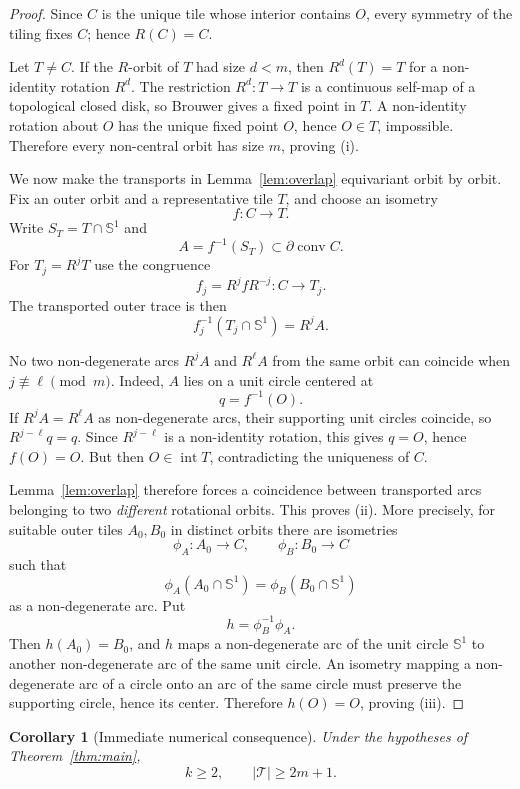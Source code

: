 \documentclass[10.5pt]{article}
\newtheorem{corollary}[theorem]{Corollary}
\theoremstyle{remark}
\newcommand{\Sph}{\mathbb S}
\newcommand{\conv}{\operatorname{conv}}
\newcommand{\interior}{\operatorname{int}}
\begin{document}
\begin{proof}
Since $C$ is the unique tile whose interior contains $O$, every symmetry of the tiling fixes $C$; hence $R(C)=C$.

Let $T\ne C$. If the $R$-orbit of $T$ had size $d<m$, then $R^d(T)=T$ for a non-identity rotation $R^d$. The restriction $R^d:T\to T$ is a continuous self-map of a topological closed disk, so Brouwer gives a fixed point in $T$. A non-identity rotation about $O$ has the unique fixed point $O$, hence $O\in T$, impossible. Therefore every non-central orbit has size $m$, proving (i).

We now make the transports in Lemma~\ref{lem:overlap} equivariant orbit by orbit. Fix an outer orbit and a representative tile $T$, and choose an isometry
\[
 f:C\longrightarrow T.
\]
Write $S_T=T\cap\Sph^1$ and
\[
 A=f^{-1}(S_T)\subset\partial\conv C.
\]
For $T_j=R^jT$ use the congruence
\[
 f_j=R^j f R^{-j}:C\longrightarrow T_j.
\]
The transported outer trace is then
\[
 f_j^{-1}(T_j\cap\Sph^1)=R^jA.
\]

No two non-degenerate arcs $R^jA$ and $R^\ell A$ from the same orbit can coincide when $j\not\equiv\ell\pmod m$. Indeed, $A$ lies on a unit circle centered at
\[
 q=f^{-1}(O).
\]
If $R^jA=R^\ell A$ as non-degenerate arcs, their supporting unit circles coincide, so $R^{j-\ell}q=q$. Since $R^{j-\ell}$ is a non-identity rotation, this gives $q=O$, hence $f(O)=O$. But then $O\in\interior T$, contradicting the uniqueness of $C$.

Lemma~\ref{lem:overlap} therefore forces a coincidence between transported arcs belonging to two \emph{different} rotational orbits. This proves (ii). More precisely, for suitable outer tiles $A_0,B_0$ in distinct orbits there are isometries
\[
 \phi_A:A_0\to C,\qquad \phi_B:B_0\to C
\]
such that
\[
 \phi_A(A_0\cap\Sph^1)=\phi_B(B_0\cap\Sph^1)
\]
as a non-degenerate arc. Put
\[
 h=\phi_B^{-1}\phi_A.
\]
Then $h(A_0)=B_0$, and $h$ maps a non-degenerate arc of the unit circle $\Sph^1$ to another non-degenerate arc of the same unit circle. An isometry mapping a non-degenerate arc of a circle onto an arc of the same circle must preserve the supporting circle, hence its center. Therefore $h(O)=O$, proving (iii).
\end{proof}

\begin{corollary}[Immediate numerical consequence]\label{cor:k2}
Under the hypotheses of Theorem~\ref{thm:main},
\[
 k\ge2,
 \qquad
 |\mathcal T|\ge 2m+1.
\]
\end{corollary}
\end{document}
